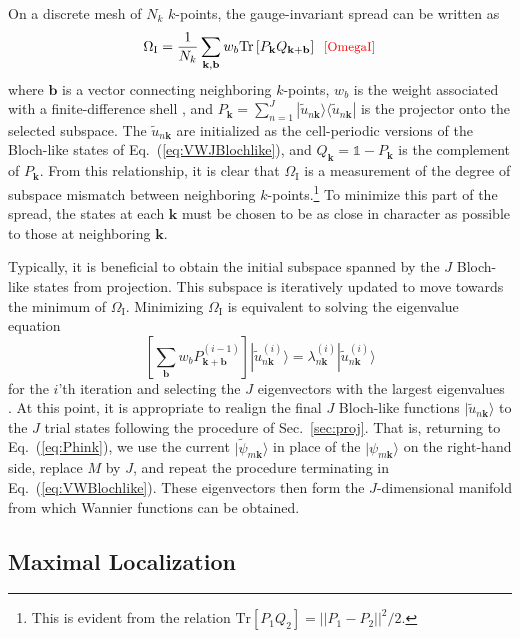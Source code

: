 \documentclass[galley,aps,pra,10pt,amsmath,amssymb,
    superscriptaddress,nofootinbib,longbibliography]{revtex4-2}
\def\Red#1{\textcolor{red}{#1}}
\newcounter{comm}
\newcommand{\eqlab}[1]{\Red{\hbox{\small\;\;[#1]}}\label{eq:#1}}
\newcommand{\eqlab}[1]{\label{eq:#1}}
\newcommand{\eq}[1]{Eq.~(\ref{eq:#1})}
\newcommand{\sref}[1]{Sec.~\ref{sec:#1}}
\newcommand{\ket}[1]{\vert#1\rangle}
\begin{document}
On a discrete mesh of $N_k$ $k$-points, the gauge-invariant spread can be written as
\begin{equation}
    \Omega_\textrm{I} = \frac{1}{N_k} \sum_{\mathbf{k}, \mathbf{b}} w_b \text{Tr} \left[  P_{\mathbf{k}} Q_{\mathbf{k+b}}  \right] 
\eqlab{OmegaI}
\end{equation}
where $\mathbf{b}$ is a vector connecting neighboring $k$-points, $w_b$ is the weight associated with a finite-difference shell \cite{marzari1997}, and $P_{\mathbf{k}} = \sum_{n=1}^{J} |\tilde{u}_{n\mathbf{k}} \rangle \langle \tilde{u}_{n\mathbf{k}} |$ is the projector onto the selected subspace. The $\tilde{u}_{n\mathbf{k}}$ are initialized as the cell-periodic versions of the Bloch-like states of \eq{VWJBlochlike}, and $Q_{\mathbf{k}} = \mathbb{1} - P_{\mathbf{k}}$ is the complement of $P_{\mathbf{k}}$. From this relationship, it is clear that $\Omega_\textrm{I}$ is a measurement of the degree of subspace mismatch between neighboring $k$-points.\footnote{This is evident from the relation $\text{Tr} \left[  P_{1} Q_{2}  \right] = || P_1 - P_2||^2/2$.} To minimize this part of the spread, the states at each $\mathbf{k}$ must be chosen to be as close in character as possible to those at neighboring $\mathbf{k}$.


Typically, it is beneficial to obtain the initial subspace spanned by the $J$ Bloch-like states from projection. This subspace is iteratively updated to move towards the minimum of $\Omega_\textrm{I}$. Minimizing $\Omega_\textrm{I}$ is equivalent to solving the eigenvalue equation
\begin{equation}
    \left[ \sum_{\mathbf{b}} w_b P_{\mathbf{k+b}}^{(i-1)}\right] |\tilde{u}_{n\mathbf{k}}^{(i)}\rangle = \lambda_{n\mathbf{k}}^{(i)}  |\tilde{u}_{n\mathbf{k}}^{(i)}\rangle
\end{equation}
for the $i$'th iteration and selecting the $J$ eigenvectors with the largest eigenvalues \cite{souza2001, marzari2012}. At this point, it is appropriate to realign the final $J$ Bloch-like functions $|\tilde{u}_{n\mathbf{k}}\rangle$ to the $J$ trial states following the procedure of \sref{proj}. That is, returning to \eq{Phink}, we use the current $\ket{\tilde{\psi}_{m\mathbf{k}}}$ in place of the $\ket{\psi_{m\mathbf{k}}}$ on the right-hand side, replace $M$ by $J$, and repeat the procedure terminating in \eq{VWBlochlike}. These eigenvectors then form the $J$-dimensional manifold from which Wannier functions can be obtained.

\subsection{Maximal Localization}
\end{document}

